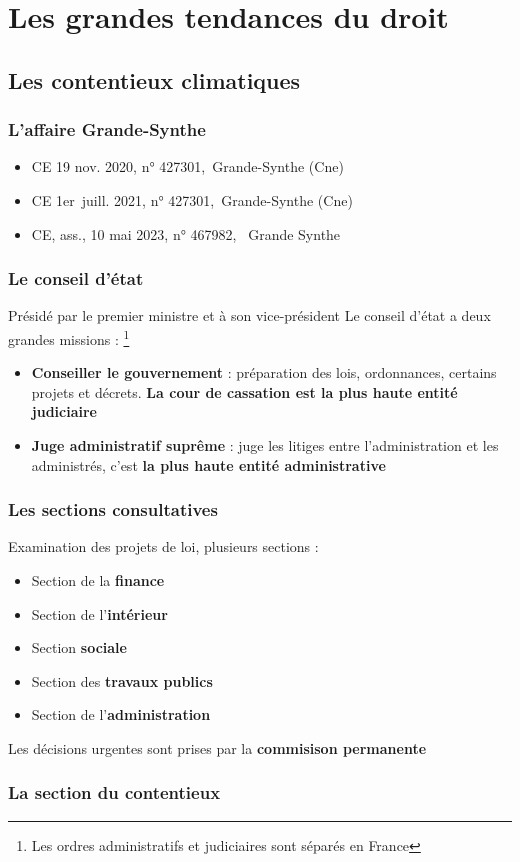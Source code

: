 \chapter{Les grandes tendances du droit}
\section{Les contentieux climatiques}
\subsection{L’affaire Grande-Synthe}
\begin{itemize}
    \item CE 19 nov. 2020, n° 427301, Grande-Synthe (Cne)
    \item CE 1er juill. 2021, n° 427301, Grande-Synthe (Cne)
    \item CE, ass., 10 mai 2023, n° 467982,  Grande Synthe
\end{itemize}
\subsection{Le conseil d'état}
Présidé par le premier ministre et à son vice-président
Le conseil d'état a deux grandes missions : \footnote{Les ordres administratifs et judiciaires sont séparés en France}
\begin{itemize}
    \item \textbf{Conseiller le gouvernement} : préparation des lois, ordonnances, certains projets et décrets. \textbf{La cour de cassation est la plus haute entité judiciaire}
    \item \textbf{Juge administratif suprême} : juge les litiges entre l'administration et les administrés, c'est \textbf{la plus haute entité administrative}
\end{itemize}
\newpage
\subsection{Les sections consultatives}
Examination des projets de loi, plusieurs sections :
\begin{itemize}
    \item Section de la \textbf{finance}
    \item Section de l'\textbf{intérieur}
    \item Section \textbf{sociale}
    \item Section des \textbf{travaux publics}
    \item Section de l'\textbf{administration}
\end{itemize}
Les décisions urgentes sont prises par la \textbf{commisison permanente}
\subsection{La section du contentieux}